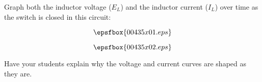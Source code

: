

Graph both the inductor voltage ($E_L$) and the inductor current ($I_L$) over time as the switch is closed in this circuit:

$$\epsfbox{00435x01.eps}$$







$$\epsfbox{00435x02.eps}$$







Have your students explain why the voltage and current curves are shaped as they are.




